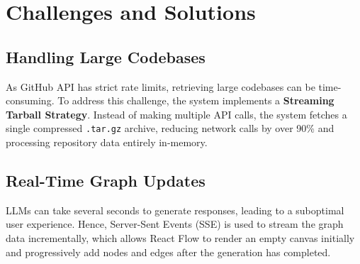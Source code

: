 \section{Challenges and Solutions}
\subsection{Handling Large Codebases}
As GitHub API has strict rate limits, retrieving large codebases can be time-consuming. To address this challenge, the system implements a \textbf{Streaming Tarball Strategy}. Instead of making multiple API calls, the system fetches a single compressed \texttt{.tar.gz} archive, reducing network calls by over 90\% and processing repository data entirely in-memory.

\subsection{Real-Time Graph Updates}
LLMs can take several seconds to generate responses, leading to a suboptimal user experience. Hence, Server-Sent Events (SSE) is used to stream the graph data incrementally, which allows React Flow to render an empty canvas initially and progressively add nodes and edges after the generation has completed.
